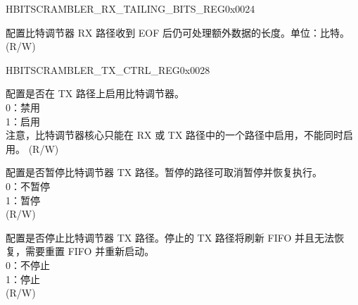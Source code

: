 \begin{register}{H}{BITSCRAMBLER\_RX\_TAILING\_BITS\_REG}{0x0024}\label{regdesc:BITSCRAMBLERRXTAILINGBITSREG}
%
%
\regnewline%
\begin{regdesc}\begin{reglist}
\label{fielddesc:BITSCRAMBLERRXTAILINGBITS}\item [BITSCRAMBLER\_RX\_TAILING\_BITS] 配置比特调节器 RX 路径收到 EOF 后仍可处理额外数据的长度。单位：比特。 (R/W)
\end{reglist}\end{regdesc}
\end{register}


\begin{register}{H}{BITSCRAMBLER\_TX\_CTRL\_REG}{0x0028}\label{regdesc:BITSCRAMBLERTXCTRLREG}
%
%
%
%
%
%
%
%
%
%
\regnewline%
\begin{regdesc}\begin{reglist}
\label{fielddesc:BITSCRAMBLERTXENA}\item [BITSCRAMBLER\_TX\_ENA] 配置是否在 TX 路径上启用比特调节器。\\
0：禁用\\
1：启用\\
注意，比特调节器核心只能在 RX 或 TX 路径中的一个路径中启用，不能同时启用。
(R/W)
\label{fielddesc:BITSCRAMBLERTXPAUSE}\item [BITSCRAMBLER\_TX\_PAUSE] 配置是否暂停比特调节器 TX 路径。暂停的路径可取消暂停并恢复执行。\\0：不暂停\\1：暂停\\(R/W)
\label{fielddesc:BITSCRAMBLERTXHALT}\item [BITSCRAMBLER\_TX\_HALT] 配置是否停止比特调节器 TX 路径。停止的 TX 路径将刷新 FIFO 并且无法恢复，需要重置 FIFO 并重新启动。 \\0：不停止\\1：停止\\(R/W)

\end{reglist}
\end{regdesc}
\end{register}
